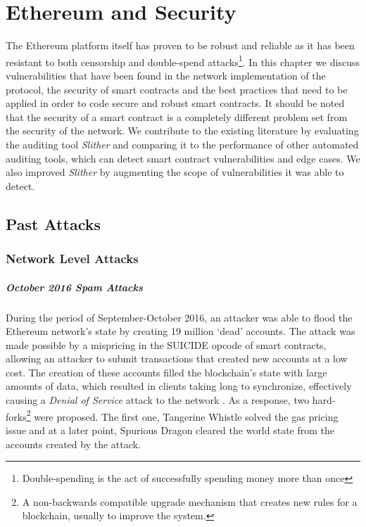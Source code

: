 \chapter{Ethereum and Security} \label{ch:security}

The Ethereum platform itself has proven to be robust and reliable as it has been resistant to both censorship and double-spend attacks\footnote{Double-spending is the act of successfully spending money more than once}. In this chapter we discuss vulnerabilities that have been found in the network implementation of the protocol, the security of smart contracts and the best practices that need to be applied in order to code secure and robust smart contracts. It should be noted that the security of a smart contract is a completely different problem set from the security of the network. We contribute to the existing literature by evaluating the auditing tool \textit{Slither} and comparing it to the performance of other automated auditing tools, which can detect smart contract vulnerabilities and edge cases. We also improved \textit{Slither} by augmenting the scope of vulnerabilities it was able to detect.

\section{Past Attacks} \label{past-attacks}

\subsection{Network Level Attacks}

\paragraph{October 2016 Spam Attacks}
During the period of September-October 2016, an attacker was able to flood the Ethereum network's state by creating 19 million `dead' accounts. The attack was made possible by a mispricing in the SUICIDE opcode of smart contracts, allowing an attacker to submit transactions that created new accounts at a low cost. The creation of these accounts filled the blockchain's state with large amounts of data, which resulted in clients taking long to synchronize, effectively causing a \textit{Denial of Service} attack to the network \cite{eip150faq}. As a response, two hard-forks\footnote{A non-backwards compatible upgrade mechanism that creates new rules for a blockchain, usually to improve the system.} were proposed. The first one, Tangerine Whistle\cite{eip608} solved the gas pricing issue and at a later point, Spurious Dragon\cite{eip608} cleared the world state from the accounts created by the attack. 

